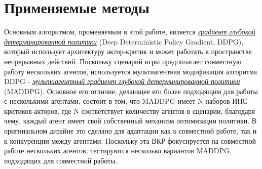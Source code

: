 \chapter{Применяемые методы} \label{ch3}

Основным алгоритмом, применяемым в этой работе, является \hyperref[acr:ddpg]{\textit{градиент глубокой детерминированной политики}} (Deep Deterministic Policy Gradient, DDPG), который использует архитектуру актор-критик и может работать в пространстве непрерывных действий. Поскольку сценарий игры предполагает совместную работу нескольких агентов, используется мультиагентная модификация алгоритма DDPG - \hyperref[acr:maddpg]{\textit{мультиагентный градиент глубокой детерминированной политики}} (MADDPG). Основное его отличие, делающее его более подходящим для работы с несколькими агентами, состоит в том, что MADDPG имеет N наборов ИНС критиков-акторов, где N соответствует количеству агентов в сценарии, благодаря чему, каждый агент имеет свой собственный механизм оптимизации политики. В оригинальном дизайне \cite{lowe2017multiagent} это сделано для адаптации как к совместной работе, так и к конкуренции между агентами.
Поскольку эта ВКР фокусируется на совместной работе нескольких агентов, тестируются несколько вариантов MADDPG, подходящих для совместной работы. %


